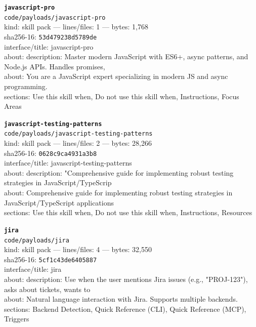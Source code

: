 \noindent\textbf{\texttt{javascript-pro}}\\
\texttt{code/payloads/javascript-pro}\\
kind: skill pack --- lines/files: 1 --- bytes: 1,768\\
sha256-16: \texttt{53d479238d5789de}\\
interface/title: javascript-pro\\
about: description: Master modern JavaScript with ES6+, async patterns, and Node.js APIs. Handles promises,\\
about: You are a JavaScript expert specializing in modern JS and async programming.\\
sections: Use this skill when, Do not use this skill when, Instructions, Focus Areas\\
\vspace*{6.0pt}

\noindent\textbf{\texttt{javascript-testing-patterns}}\\
\texttt{code/payloads/javascript-testing-patterns}\\
kind: skill pack --- lines/files: 2 --- bytes: 28,266\\
sha256-16: \texttt{0628c9ca4931a3b8}\\
interface/title: javascript-testing-patterns\\
about: description: "Comprehensive guide for implementing robust testing strategies in JavaScript/TypeScrip\\
about: Comprehensive guide for implementing robust testing strategies in JavaScript/TypeScript applications\\
sections: Use this skill when, Do not use this skill when, Instructions, Resources\\
\vspace*{6.0pt}
\newpage

\noindent\textbf{\texttt{jira}}\\
\texttt{code/payloads/jira}\\
kind: skill pack --- lines/files: 4 --- bytes: 32,550\\
sha256-16: \texttt{5cf1c43de6405887}\\
interface/title: jira\\
about: description: Use when the user mentions Jira issues (e.g., "PROJ-123"), asks about tickets, wants to\\
about: Natural language interaction with Jira. Supports multiple backends.\\
sections: Backend Detection, Quick Reference (CLI), Quick Reference (MCP), Triggers\\
\vspace*{6.0pt}

